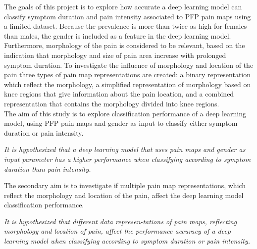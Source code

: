 \noindent
The goals of this project is to explore how accurate a deep learning model can classify symptom duration and pain intensity associated to PFP pain maps using a limited dataset. Because the prevalence is more than twice as high for females than males, the gender is included as a feature in the deep learning model. 
Furthermore, morphology of the pain is considered to be relevant, based on the indication that morphology and size of pain area increase with prolonged symptom duration. 
To investigate the influence of morphology and location of the pain three types of pain map representations are created: a binary representation which reflect the morphology, a simplified representation of morphology based on knee regions that give information about the pain location, and a combined representation that contains the morphology divided into knee regions.\\
\noindent
The aim of this study is to explore classification performance of a deep learning model, using PFP pain maps and gender as input to classify either symptom duration or pain intensity. 

\begin{center}
\textit{It is hypothesized that a deep learning model that uses pain maps and gender as input parameter has a higher performance when classifying according to symptom duration than pain intensity.}
\end{center}

\noindent
The secondary aim is to investigate if multiple pain map representations, which reflect the morphology and location of the pain, affect the deep learning model classification performance.                                                    
\begin{center}
\textit{It is hypothesized that different data represen-\newline tations of pain maps, reflecting morphology and location of pain, affect the performance
accuracy of a deep learning model when classifying according to symptom duration or pain intensity.
}
\end{center}

